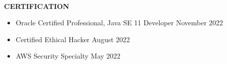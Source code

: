 \begin{flushleft}
    \hrulefill \\
    \begin{large}
        \textbf{CERTIFICATION} \\
    \end{large} 
\end{flushleft}
\begin{itemize}
	\item Oracle Certified Professional, Java SE 11 Developer \hfill November 2022
	\item Certified Ethical Hacker \hfill August 2022
	\item AWS Security Specialty \hfill May 2022
\end{itemize}